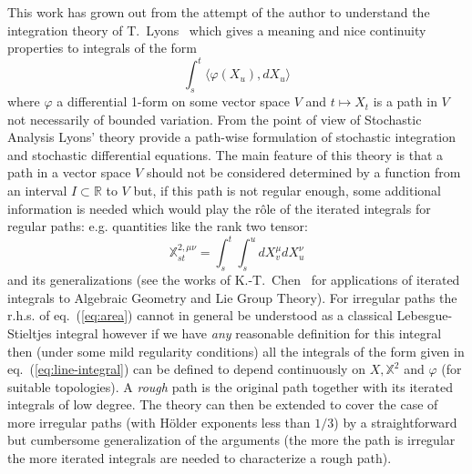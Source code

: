 \documentclass[a4paper,12pt,reqno]{amsproc}
\newcommand{\XX}{\mathbb{X}}
\newcommand{\RR}{\mathbb{R}}
\begin{document}
This work has grown out from the attempt of the author to understand
the integration theory of T.~Lyons~\cite{Lyons,lyonsbook} which gives a meaning
and nice continuity properties to integrals of the form
\begin{equation}
\label{eq:line-integral}
  \int_s^t \langle \varphi(X_u), dX_u\rangle
\end{equation}
where $\varphi$ a differential 1-form on some vector space $V$
and $t \mapsto X_t$ is a path in $V$  not necessarily of bounded
variation. 
From the point of view of Stochastic Analysis Lyons' theory provide a
path-wise formulation of stochastic
integration and stochastic differential equations. The main feature of
this theory is
that a path in a vector space $V$ should not be considered determined 
by a function from an interval $I \subset \RR$ to $V$ but, if this
path is not regular enough,  some additional
information is needed which would play the r\^ole of the iterated integrals for
regular paths: e.g. quantities like the rank two tensor:
\begin{equation}
  \label{eq:area}
\XX^{2,\mu\nu}_{st} = \int_s^t \int_s^u dX^\mu_v dX_u^\nu
\end{equation}
and its generalizations (see the works of K.-T.~Chen~\cite{ChenAll} for 
applications of iterated integrals to Algebraic Geometry and Lie Group Theory).
For irregular paths the r.h.s. of eq.~(\ref{eq:area}) cannot in
general be
understood as a classical Lebesgue-Stieltjes integral however if we have
\emph{any} reasonable definition for this integral then (under some
mild regularity conditions) 
 all the integrals of the form given in
eq.~(\ref{eq:line-integral}) can be defined to depend continuously on
$X,\XX^2$ and $\varphi$ (for suitable topologies). A \emph{rough} path
is the original path together with its iterated integrals of low
degree. The theory can then
be extended to cover the case of more irregular paths (with H\"older exponents less than
$1/3$) by a straightforward but cumbersome generalization of the arguments (the more the
path is irregular the more
iterated integrals are needed to characterize a rough path).
 
\bigskip
\end{document}
